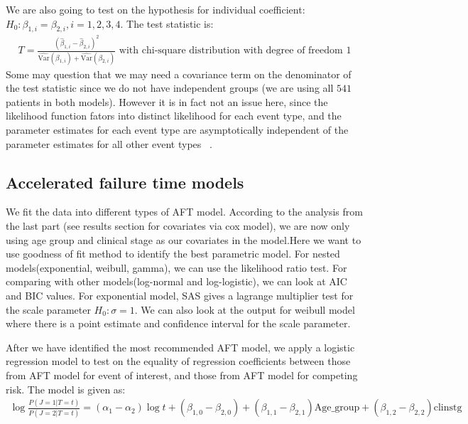 \documentclass[times, doublespace]{simauth}
\begin{document}
We are also going to test on the hypothesis for individual coefficient:  $H_0: \beta_{1, i}= \beta_{2, i}, i = 1, 2, 3, 4$. The test statistic is:
\begin{align*}
	T = \frac{(\hat{\beta}_{1, i} - \hat{\beta}_{2, i})^2}{\hat{\text{Var}}(\beta_{1, i}) + \hat{\text{Var}}(\beta_{2, i})} \text{ with chi-square distribution with degree of freedom }1
\end{align*}
Some may question that we may need a covariance term on the denominator of the test statistic since we do not have independent groups (we are using all $541$ patients in both models). However it is in fact not an issue here, since the likelihood function fators into distinct likelihood for each event type, and the parameter estimates for each event type are asymptotically independent of the parameter estimates for all other event types ~\cite{Allison10}.
\subsection{Accelerated failure time models}
We fit the data into different types of AFT model. According to the analysis from the last part (see results section for covariates via cox model), we are now only using age group and clinical stage as our covariates in the model.Here we want to use goodness of fit method to identify the best parametric model. For nested models(exponential, weibull, gamma), we can use the likelihood ratio test. For comparing with other models(log-normal and log-logistic), we can look at AIC and BIC values. For exponential model, SAS gives a lagrange multiplier test for the scale parameter $H_0: \sigma = 1$. We can also look at the output for weibull model where there is a point estimate and confidence interval for the scale parameter.

After we have identified the most recommended AFT model, we apply a logistic regression model \cite{Allison10} to test on the equality of regression coefficients between those from AFT model for event of interest, and those from AFT model for competing risk. The model is given as:
\begin{align}\label{logistic model}
	\log\frac{P(J = 1|T= t)}{P(J = 2|T = t)} = (\alpha_1 - \alpha_2)\log t + (\beta_{1, 0} - \beta_{2, 0}) + (\beta_{1, 1} - \beta_{2, 1})\text{Age}\_\text{group} + (\beta_{1, 2} - \beta_{2, 2})\text{clinstg}
\end{align}
\end{document}
